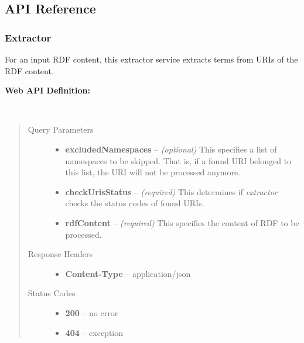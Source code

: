 \documentclass[letterpaper,10pt,english]{sphinxmanual}
\begin{document}
\subsection{API Reference}
\label{user_guide:api-reference}\label{user_guide:id2}

\subsubsection{Extractor}
\label{user_guide:extractor}\label{user_guide:extractor-api}
For an input RDF content, this extractor service extracts terms from URIs of the RDF content.

\textbf{Web API Definition:}


\begin{fulllineitems}
\label{user_guide:post--extractor_?excludedNamespaces, checkUrisStatus, rdfContent_}~\begin{quote}\begin{description}
\item[{Query Parameters}] \leavevmode\begin{itemize}
\item {} 
\textbf{excludedNamespaces} -- \emph{(optional)} This specifies a list of namespaces to be skipped. That is, if a found URI belonged to this list, the URI will not be processed anymore.

\item {} 
\textbf{checkUrisStatus} -- \emph{(required)} This determines if \emph{extractor} checks the status codes of found URIs.

\item {} 
\textbf{rdfContent} -- \emph{(required)} This specifies the content of RDF to be processed.

\end{itemize}

\item[{Response Headers}] \leavevmode\begin{itemize}
\item {} 
\textbf{Content-Type} -- application/json

\end{itemize}

\item[{Status Codes}] \leavevmode\begin{itemize}
\item {} 
\textbf{200} -- no error

\item {} 
\textbf{404} -- exception

\end{itemize}

\end{description}\end{quote}

\end{fulllineitems}
\end{document}
